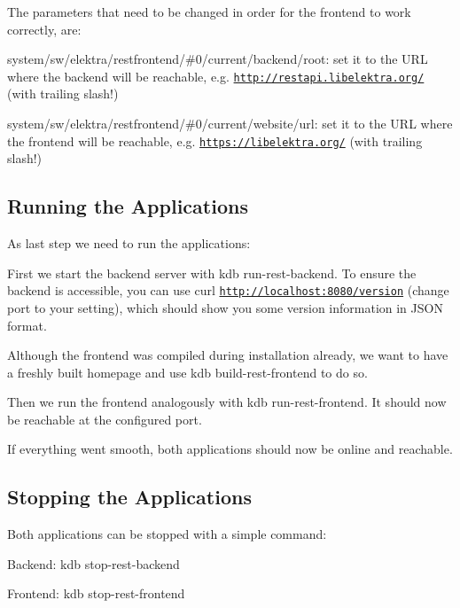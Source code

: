 The parameters that need to be changed in order for the frontend to work correctly, are\+:


\begin{DoxyItemize}
\item {\ttfamily system/sw/elektra/restfrontend/\#0/current/backend/root}\+: set it to the U\+RL where the backend will be reachable, e.\+g. {\ttfamily \href{http://restapi.libelektra.org/}{\tt http\+://restapi.\+libelektra.\+org/}} (with trailing slash!)
\item {\ttfamily system/sw/elektra/restfrontend/\#0/current/website/url}\+: set it to the U\+RL where the frontend will be reachable, e.\+g. {\ttfamily \href{https://libelektra.org/}{\tt https\+://libelektra.\+org/}} (with trailing slash!)
\end{DoxyItemize}

\subsection*{Running the Applications}

As last step we need to run the applications\+:


\begin{DoxyItemize}
\item First we start the backend server with {\ttfamily kdb run-\/rest-\/backend}. To ensure the backend is accessible, you can use {\ttfamily curl \href{http://localhost:8080/version}{\tt http\+://localhost\+:8080/version}} (change port to your setting), which should show you some version information in J\+S\+ON format.
\item Although the frontend was compiled during installation already, we want to have a freshly built homepage and use {\ttfamily kdb build-\/rest-\/frontend} to do so.
\item Then we run the frontend analogously with {\ttfamily kdb run-\/rest-\/frontend}. It should now be reachable at the configured port.
\end{DoxyItemize}

If everything went smooth, both applications should now be online and reachable.

\subsection*{Stopping the Applications}

Both applications can be stopped with a simple command\+:


\begin{DoxyItemize}
\item Backend\+: {\ttfamily kdb stop-\/rest-\/backend}
\item Frontend\+: {\ttfamily kdb stop-\/rest-\/frontend}
\end{DoxyItemize}

